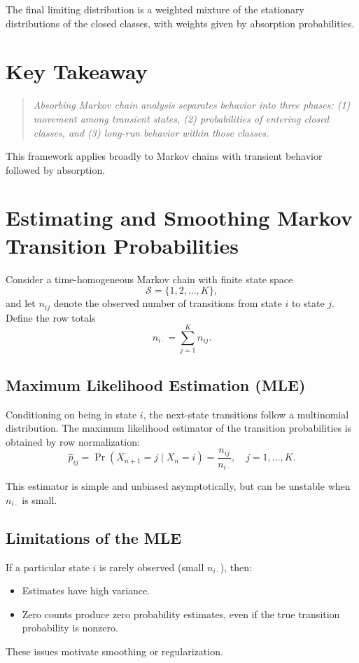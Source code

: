 \documentclass[11pt]{article}
\begin{document}
The final limiting distribution is a weighted mixture of the stationary distributions of the closed classes, with weights given by absorption probabilities.

\section*{Key Takeaway}

\begin{quote}
\textit{Absorbing Markov chain analysis separates behavior into three phases:  
(1) movement among transient states,  
(2) probabilities of entering closed classes, and  
(3) long-run behavior within those classes.}
\end{quote}

This framework applies broadly to Markov chains with transient behavior followed by absorption.

\newpage
\section*{Estimating and Smoothing Markov Transition Probabilities}

Consider a time-homogeneous Markov chain with finite state space
\[
\mathcal{S} = \{1,2,\dots,K\},
\]
and let \(n_{ij}\) denote the observed number of transitions from state \(i\) to state \(j\).
Define the row totals
\[
n_{i\cdot} = \sum_{j=1}^K n_{ij}.
\]

\subsection*{Maximum Likelihood Estimation (MLE)}

Conditioning on being in state \(i\), the next-state transitions follow a multinomial distribution.
The maximum likelihood estimator of the transition probabilities is obtained by row normalization:
\[
\hat p_{ij}
=
\Pr(X_{n+1}=j \mid X_n=i)
=
\frac{n_{ij}}{n_{i\cdot}},
\quad j=1,\dots,K.
\]

This estimator is simple and unbiased asymptotically, but can be unstable when \(n_{i\cdot}\) is small.

\subsection*{Limitations of the MLE}

If a particular state \(i\) is rarely observed (small \(n_{i\cdot}\)), then:
\begin{itemize}
  \item Estimates have high variance.
  \item Zero counts produce zero probability estimates, even if the true transition probability is nonzero.
\end{itemize}
These issues motivate smoothing or regularization.
\end{document}
